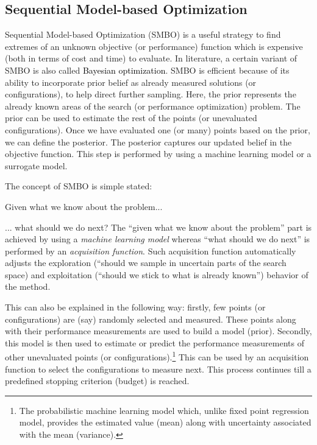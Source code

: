 \subsection{Sequential Model-based Optimization}
Sequential Model-based Optimization (SMBO) is a useful strategy to find extremes
of an unknown objective (or performance) function which is expensive (both
in terms of cost and time) to evaluate. In literature, a certain variant of SMBO is also called \textcolor{black}{Bayesian optimization}. SMBO
is efficient because of its ability to incorporate prior belief as already measured solutions (or configurations),
to help direct further sampling. Here, the prior represents
the already known areas of the search (or performance
optimization) problem. The prior can be used to estimate the
rest of the points (or unevaluated configurations). Once we have evaluated one (or many) points based on the
prior, we can define the posterior. The posterior captures
our updated belief in the objective function. This step is
performed by using a machine learning model or a surrogate model.


\noindent The concept of SMBO is simple stated:
\bi
\item
Given what we know about the problem...
\item
... what should we do next?
\ei
The ``given what we know about the problem'' part is achieved by using a \textit{machine learning model} whereas ``what should we do next'' is performed by an \textit{acquisition function}. Such acquisition function automatically adjusts the exploration (``should we sample in uncertain parts of the search space) and exploitation (``should we stick to what is already known'') behavior of the method. 

This can also be explained in the following way: firstly, few points (or configurations) are (say) randomly selected and measured. These points along with their performance measurements are used to build a model (prior). Secondly, this model is then used to estimate or predict the performance measurements of other unevaluated points (or configurations).\footnote{The probabilistic machine learning model which, unlike fixed point regression model, provides the estimated value (mean) along with uncertainty associated with the mean (variance).} This can be used by an acquisition function to select the configurations to measure next. This process continues till a predefined stopping criterion (budget) is reached.

